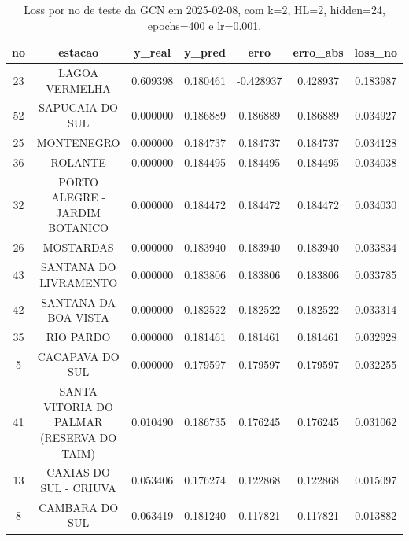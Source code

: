 \begin{table}[h]
\centering
\caption{Loss por no de teste da GCN em 2025-02-08, com k=2, HL=2, hidden=24, epochs=400 e lr=0.001.}
\label{tab:gcn_loss_k2_hl2_h24_e400_d20250208}
\begin{tabular}{ccccccc}
\toprule
no & estacao & y\_real & y\_pred & erro & erro\_abs & loss\_no \\
\midrule
23 & LAGOA VERMELHA & 0.609398 & 0.180461 & -0.428937 & 0.428937 & 0.183987 \\
52 & SAPUCAIA DO SUL & 0.000000 & 0.186889 & 0.186889 & 0.186889 & 0.034927 \\
25 & MONTENEGRO & 0.000000 & 0.184737 & 0.184737 & 0.184737 & 0.034128 \\
36 & ROLANTE & 0.000000 & 0.184495 & 0.184495 & 0.184495 & 0.034038 \\
32 & PORTO ALEGRE - JARDIM BOTANICO & 0.000000 & 0.184472 & 0.184472 & 0.184472 & 0.034030 \\
26 & MOSTARDAS & 0.000000 & 0.183940 & 0.183940 & 0.183940 & 0.033834 \\
43 & SANTANA DO LIVRAMENTO & 0.000000 & 0.183806 & 0.183806 & 0.183806 & 0.033785 \\
42 & SANTANA DA BOA VISTA & 0.000000 & 0.182522 & 0.182522 & 0.182522 & 0.033314 \\
35 & RIO PARDO & 0.000000 & 0.181461 & 0.181461 & 0.181461 & 0.032928 \\
5 & CACAPAVA DO SUL & 0.000000 & 0.179597 & 0.179597 & 0.179597 & 0.032255 \\
41 & SANTA VITORIA DO PALMAR (RESERVA DO TAIM) & 0.010490 & 0.186735 & 0.176245 & 0.176245 & 0.031062 \\
13 & CAXIAS DO SUL - CRIUVA & 0.053406 & 0.176274 & 0.122868 & 0.122868 & 0.015097 \\
8 & CAMBARA DO SUL & 0.063419 & 0.181240 & 0.117821 & 0.117821 & 0.013882 \\
\bottomrule
\end{tabular}
\end{table}
